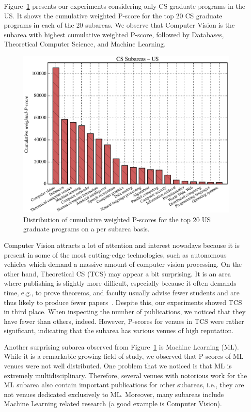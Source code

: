 \documentclass[msc]{ppgccufmg}
\begin{document}
Figure~\ref{fig:us-research} presents our experiments considering only CS graduate programs in the US. It shows the cumulative weighted P-score for the top 20 CS graduate programs in each of the 20 subareas. We observe that Computer Vision is the subarea with highest cumulative weighted P-score, followed by Databases, Theoretical Computer Science, and Machine Learning.

\begin{figure}[tb] %
    \centering
    \includegraphics[width=0.9\linewidth]{fig/char_us_research_new.eps}
    \caption{Distribution of cumulative weighted P-scores for the top 20 US graduate programs on a per subarea basis.}
    \label{fig:us-research}
\end{figure}

Computer Vision attracts a lot of attention and interest nowadays because it is present in some of the most cutting-edge technologies, such as autonomous vehicles which demand a massive amount of computer vision processing. On the other hand, Theoretical CS (TCS) may appear a bit surprising. It is an area where publishing is slightly more difficult, especially because it often demands time, e.g., to prove theorems, and faculty usually advise fewer students and are thus likely to produce fewer papers~\citep{wainer13}. Despite this, our experiments showed TCS in third place. When inspecting the number of publications, we noticed that they have fewer than others, indeed. However, P-scores for venues in TCS were rather significant, indicating that the subarea has various venues of high reputation.

Another surprising subarea observed from Figure~\ref{fig:us-research} is Machine Learning (ML). While it is a remarkable growing field of study, we observed that P-scores of ML venues were not well distributed. One problem that we noticed is that ML is extremely multidisciplinary. Therefore, several venues with notorious work for the ML subarea also contain important publications for other subareas, i.e., they are not venues dedicated exclusively to ML. Moreover, many subareas include Machine Learning related research (a good example is Computer Vision).
\end{document}
